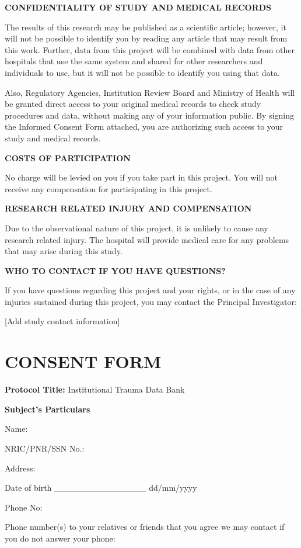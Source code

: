 \textbf{CONFIDENTIALITY OF STUDY AND MEDICAL RECORDS}

The results of this research may be published as a scientific article;
however, it will not be possible to identify you by reading any article
that may result from this work. Further, data from this project will be
combined with data from other hospitals that use the same system and
shared for other researchers and individuals to use, but it will not be
possible to identify you using that data.

Also, Regulatory Agencies, Institution Review Board and Ministry of
Health will be granted direct access to your original medical records to
check study procedures and data, without making any of your information
public. By signing the Informed Consent Form attached, you are
authorizing such access to your study and medical records.

\textbf{COSTS OF PARTICIPATION}

No charge will be levied on you if you take part in this project. You
will not receive any compensation for participating in this project.

\textbf{RESEARCH RELATED INJURY AND COMPENSATION}

Due to the observational nature of this project, it is unlikely to cause
any research related injury. The hospital will provide medical care for
any problems that may arise during this study.

\textbf{WHO TO CONTACT IF YOU HAVE QUESTIONS?}

If you have questions regarding this project and your rights, or in the
case of any injuries sustained during this project, you may contact the
Principal Investigator:

{[}Add study contact information{]}

\section{CONSENT FORM}\label{consent-form}

\textbf{Protocol Title:} Institutional Trauma Data Bank

\textbf{Subject's Particulars}

Name:

NRIC/PNR/SSN No.:

Address:

Date of birth \_\_\_\_\_\_\_\_\_\_\_\_\_\_\_ dd/mm/yyyy

Phone No:

Phone number(s) to your relatives or friends that you agree we may
contact if you do not answer your phone:

